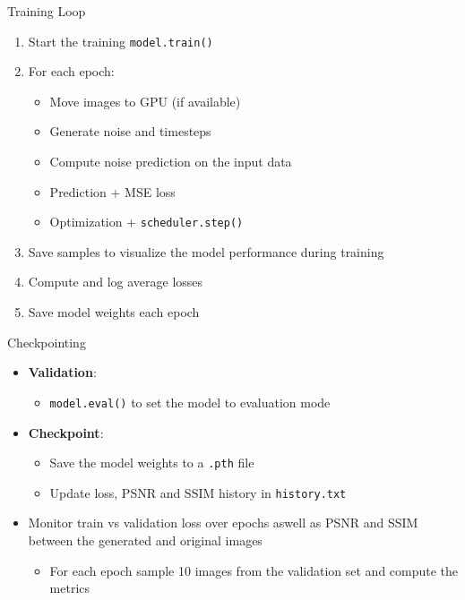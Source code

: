 \begin{frame}{Training Loop}
    \begin{enumerate}
        \item Start the training \texttt{model.train()}
        \item For each epoch:
              \begin{itemize}
                  \item Move images to GPU (if available)
                  \item Generate noise and timesteps
                  \item Compute noise prediction on the input data
                  \item Prediction + MSE loss
                  \item Optimization + \texttt{scheduler.step()}
              \end{itemize}
        \item Save samples to visualize the model performance during training
        \item Compute and log average losses
        \item Save model weights each epoch
    \end{enumerate}
\end{frame}

\begin{frame}{Checkpointing}
    \begin{itemize}
        \item \textbf{Validation}:
              \begin{itemize}
                  \item \texttt{model.eval()} to set the model to evaluation mode
              \end{itemize}
        \item \textbf{Checkpoint}:
              \begin{itemize}
                  \item Save the model weights to a \texttt{.pth} file
                  \item Update loss, PSNR and SSIM history in \texttt{history.txt}
              \end{itemize}
        \item Monitor train vs validation loss over epochs aswell as PSNR and SSIM between the generated and original images
              \begin{itemize}
                  \item For each epoch sample 10 images from the validation set and compute the metrics
              \end{itemize}
    \end{itemize}
\end{frame}

